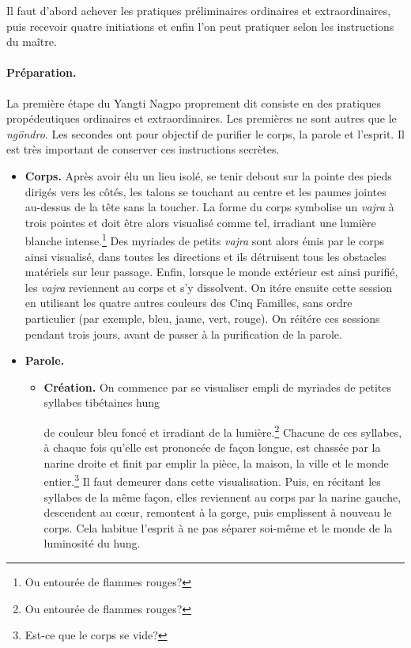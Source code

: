 \documentclass[11pt,a4paper]{article}
\def\myhung{\ooalign{%
  {\raise0.7\fontdimen5\font\hbox{\hskip0.15em\tibNyizlanaada}}%
  \cr\V{h}{\raise0.2em\hbox{\hskip0.25em\scriptsize 'u\notsheg}}\notsheg}%
}
\newcommand\yangti{Yangti Nagpo\xspace}
\begin{document}
Il faut d'abord achever les pratiques préliminaires ordinaires et
extraordinaires, puis recevoir quatre initiations et enfin l'on peut
pratiquer selon les instructions du maître.

\paragraph{Préparation.}

La première étape du \yangti proprement dit consiste en des pratiques
propédeutiques ordinaires et extraordinaires. Les premières ne sont
autres que le \emph{ngöndro}. Les secondes ont pour objectif de
purifier le corps, la parole et l'esprit. Il est très important de
conserver ces instructions secrètes.

\begin{itemize}

  \item \textbf{Corps.} Après avoir élu un lieu isolé, se tenir debout
  sur la pointe des pieds dirigés vers les côtés, les talons se
  touchant au centre et les paumes jointes au\hyp{}dessus de la tête
  sans la toucher. La forme du corps symbolise un \emph{vajra} à trois
  pointes et doit être alors visualisé comme tel, irradiant une
  lumière blanche intense.\footnote{Ou entourée de flammes rouges?}
  Des myriades de petits \emph{vajra} sont alors émis par le corps
  ainsi visualisé, dans toutes les directions et ils détruisent tous
  les obstacles matériels sur leur passage. Enfin, lorsque le monde
  extérieur est ainsi purifié, les \emph{vajra} reviennent au corps et
  s'y dissolvent. On itére ensuite cette session en utilisant les
  quatre autres couleurs des Cinq Familles, sans ordre particulier
  (par exemple, bleu, jaune, vert, rouge). On réitére ces sessions
  pendant trois jours, avant de passer à la purification de la parole.

  \item \textbf{Parole.}
    \begin{itemize}

      \item \textbf{Création.} On commence par se visualiser empli de
      myriades de petites syllabes tibétaines \textsf{hung}
      \smallskip
      \begin{center}
        \tib \myhung
      \end{center}
      de couleur bleu foncé et irradiant de la lumière.\footnote{Ou
      entourée de flammes rouges?}  Chacune de ces syllabes, à chaque
      fois qu'elle est prononcée de façon longue, est chassée par la
      narine droite et finit par emplir la pièce, la maison, la ville
      et le monde entier.\footnote{Est\hyp{}ce que le corps se vide?}
      Il faut demeurer dans cette visualisation. Puis, en récitant les
      syllabes de la même façon, elles reviennent au corps par la
      narine gauche, descendent au c{\oe}ur, remontent à la gorge,
      puis emplissent à nouveau le corps. Cela habitue l'esprit à ne
      pas séparer soi\hyp{}même et le monde de la luminosité du
      \textsf{hung}.


\end{itemize}
\end{itemize}
\end{document}

